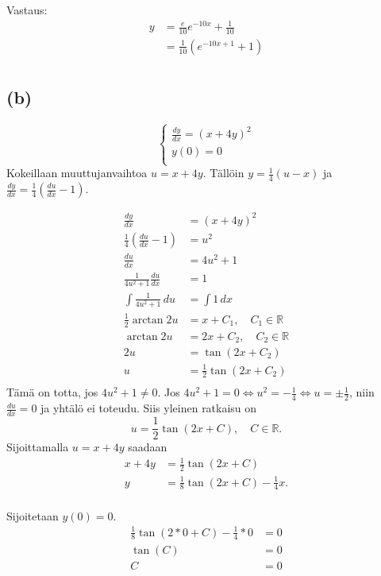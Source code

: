 \documentclass{article}
\begin{document}
Vastaus:
\begin{align*}
  y &= \frac{e}{10} e^{-10x} + \frac{1}{10} \\
    &= \frac{1}{10} (e^{-10x + 1} + 1) \\
\end{align*}

\subsection*{(b)}
\[
  \begin{cases}
    \frac{dy}{dx} = (x + 4y)^2 \\
    y(0) = 0 \\
  \end{cases}
\]
Kokeillaan muuttujanvaihtoa $u = x + 4y$.
Tällöin $y = \frac{1}{4}(u - x)$ ja $\frac{dy}{dx} = \frac{1}{4}(\frac{du}{dx} - 1)$.

\begin{align*}
  \frac{dy}{dx} &= (x + 4y)^2 \\
  \frac{1}{4}(\frac{du}{dx} - 1) &= u^2 \\
  \frac{du}{dx} &= 4u^2 + 1 \\
  \frac{1}{4u^2 + 1} \frac{du}{dx} &= 1 \\
  \int \frac{1}{4u^2 + 1} \,du &= \int 1 \,dx \\
  \frac{1}{2} \arctan 2u &= x + C_1, \quad C_1 \in \mathbb{R} \\
  \arctan 2u &= 2x + C_2, \quad C_2 \in \mathbb{R} \\
  2u &= \tan(2x + C_2) \\
  u &= \frac{1}{2} \tan(2x + C_2) \\
\end{align*}
Tämä on totta, jos $4u^2 + 1 \neq 0$.
Jos $4u^2 + 1 = 0 \iff u^2 = -\frac{1}{4} \iff u = \pm \frac{1}{2}$,
niin $\frac{du}{dx} = 0$ ja yhtälö ei toteudu.
Siis yleinen ratkaisu on
\[
  u = \frac{1}{2} \tan(2x + C), \quad C \in \mathbb{R}.
\]
Sijoittamalla $u = x + 4y$ saadaan
\begin{align*}
  x + 4y &= \frac{1}{2} \tan(2x + C) \\
  y &= \frac{1}{8} \tan(2x + C) - \frac{1}{4}x. \\
\end{align*}

Sijoitetaan $y(0) = 0$.
\begin{align*}
  \frac{1}{8} \tan(2*0 + C) - \frac{1}{4}*0 &= 0 \\
  \tan(C) &= 0 \\
  C &= 0 \\
\end{align*}
\end{document}
